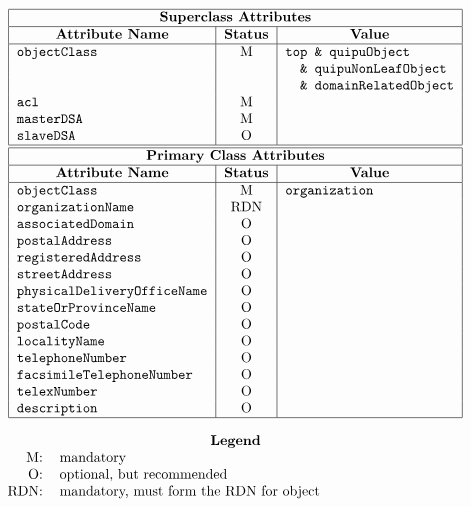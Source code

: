 
\smaller

\[\begin{tabular}{|l|c|l|}
\hline
\multicolumn{3}{|c|}{\bf Superclass Attributes}\\
\hline
\multicolumn{1}{|c|}{\bf Attribute Name}&
			\multicolumn{1}{c|}{\bf Status}&
				\multicolumn{1}{c|}{\bf Value}\\
\hline
\verb"objectClass"&	M&	\verb"top & quipuObject"\\
&			&	\verb"  & quipuNonLeafObject"\\
&			&	\verb"  & domainRelatedObject"\\
\verb"acl"&		M&	\\
\verb"masterDSA"&	M&	\\
\verb"slaveDSA"&	O&	\\
\hline
\hline
\multicolumn{3}{|c|}{\bf Primary Class Attributes}\\
\hline
\multicolumn{1}{|c|}{\bf Attribute Name}&
			\multicolumn{1}{c|}{\bf Status}&
				\multicolumn{1}{c|}{\bf Value}\\
\hline
\verb"objectClass"&	M&	\verb"organization"\\
\verb"organizationName"&
			RDN&	\\
\verb"associatedDomain"&
			O&	\\
\verb"postalAddress"&	O&	\\
\verb"registeredAddress"&
			O&	\\
\verb"streetAddress"&	O&	\\
\verb"physicalDeliveryOfficeName"&
			O&	\\
\verb"stateOrProvinceName"&
			O&	\\
\verb"postalCode"&	O&	\\
\verb"localityName"&	O&	\\
\verb"telephoneNumber"&	O&	\\
\verb"facsimileTelephoneNumber"&
			O&	\\
\verb"telexNumber"&	O&	\\
\verb"description"&	O&	\\
\hline
\end{tabular}\]

\[\begin{tabular}{rp{4in}}
\multicolumn{2}{c}{\bf Legend}\\
M:&	mandatory\\
O:&	optional, but recommended\\
RDN:&	mandatory, must form the RDN for object
\end{tabular}\]
